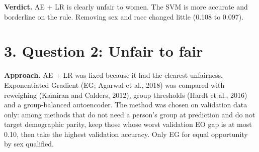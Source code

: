 \documentclass[10pt,a4paper]{article}
\begin{document}
\textbf{Verdict.} AE + LR is clearly unfair to women. The SVM is more accurate and borderline on the rule. Removing sex and race changed little (\textminus{}0.108 to \textminus{}0.097).

\section*{3. Question 2: Unfair to fair}

\noindent{}

\textbf{Approach.} AE + LR was fixed because it had the clearest unfairness. Exponentiated Gradient (EG; Agarwal et al., 2018) was compared with reweighing (Kamiran and Calders, 2012), group thresholds (Hardt et al., 2016) and a group-balanced autoencoder. The method was chosen on validation data only: among methods that do not need a person's group at prediction and do not target demographic parity, keep those whose worst validation EO gap is at most 0.10, then take the highest validation accuracy. Only EG for equal opportunity by sex qualified.
\end{document}
